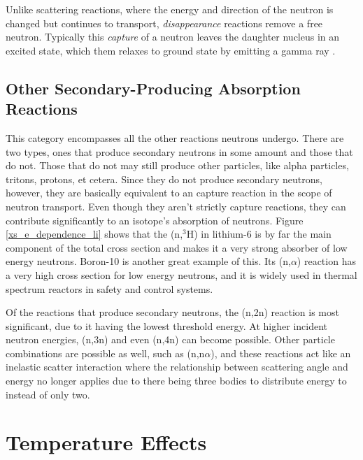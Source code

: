 Unlike scattering reactions, where the energy and direction of the neutron is changed but continues to transport, \emph{disappearance} reactions remove a free neutron.  Typically this \emph{capture} of a neutron leaves the daughter nucleus in an excited state, which them relaxes to ground state by emitting a gamma ray \cite{krane}.


\subsection{Other Secondary-Producing Absorption Reactions}

This category encompasses all the other reactions neutrons undergo.  There are two types, ones that produce secondary neutrons in some amount and those that do not.  Those that do not may still produce other particles, like alpha particles, tritons, protons, et cetera.  Since they do not produce secondary neutrons, however, they are basically equivalent to an capture reaction in the scope of neutron transport.  Even though they aren't strictly capture reactions, they can contribute significantly to an isotope's absorption of neutrons.  Figure \ref{xs_e_dependence_li} shows that the (n,$^3$H) in lithium-6 is by far the main component of the total cross section and makes it a very strong absorber of low energy neutrons.  Boron-10 is another great example of this.  Its (n,$\alpha$) reaction has a very high cross section for low energy neutrons, and it is widely used in thermal spectrum reactors in safety and control systems.

Of the reactions that produce secondary neutrons, the (n,2n) reaction is most significant, due to it having the lowest threshold energy.  At higher incident neutron energies, (n,3n) and even (n,4n) can become possible.  Other particle combinations are possible as well, such as (n,n$\alpha$), and these reactions act like an inelastic scatter interaction where the relationship between scattering angle and energy no longer applies due to there being three bodies to distribute energy to instead of only two.


\section{Temperature Effects}
\label{sec:temp}

